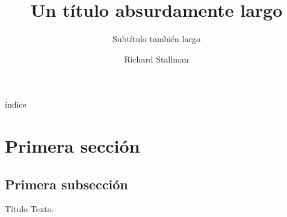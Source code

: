 \documentclass{beamer}
\title[Título corto]{Un título absurdamente largo}
\subtitle[Subtítulo corto]{Subtítulo también largo}
\author[iGNUcio]{Richard Stallman}
\begin{document}
  \begin{frame}
    \titlepage %
  \end{frame}

  \begin{frame}{índice}
    \tableofcontents
  \end{frame}

  \section{Primera sección}
  \subsection{Primera subsección}
  
  \begin{frame}{Título}
    Texto.
  \end{frame}
\end{document}

